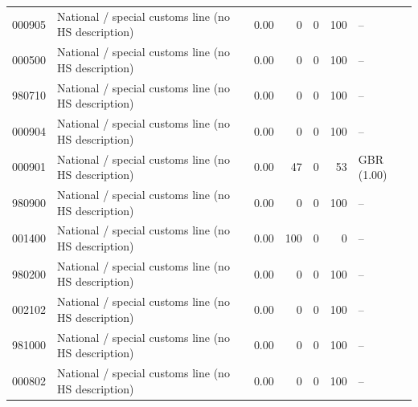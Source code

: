 \begin{tabular}{@{}l p{6.4cm} r r r r l@{}}
000905 & National /\allowbreak{} special customs line (no HS description) & 0.00 & 0 & 0 & 100 & -- \\
000500 & National /\allowbreak{} special customs line (no HS description) & 0.00 & 0 & 0 & 100 & -- \\
980710 & National /\allowbreak{} special customs line (no HS description) & 0.00 & 0 & 0 & 100 & -- \\
000904 & National /\allowbreak{} special customs line (no HS description) & 0.00 & 0 & 0 & 100 & -- \\
000901 & National /\allowbreak{} special customs line (no HS description) & 0.00 & 47 & 0 & 53 & GBR (1.00) \\
980900 & National /\allowbreak{} special customs line (no HS description) & 0.00 & 0 & 0 & 100 & -- \\
001400 & National /\allowbreak{} special customs line (no HS description) & 0.00 & 100 & 0 & 0 & -- \\
980200 & National /\allowbreak{} special customs line (no HS description) & 0.00 & 0 & 0 & 100 & -- \\
002102 & National /\allowbreak{} special customs line (no HS description) & 0.00 & 0 & 0 & 100 & -- \\
981000 & National /\allowbreak{} special customs line (no HS description) & 0.00 & 0 & 0 & 100 & -- \\
000802 & National /\allowbreak{} special customs line (no HS description) & 0.00 & 0 & 0 & 100 & -- \\
\bottomrule
\end{tabular}
